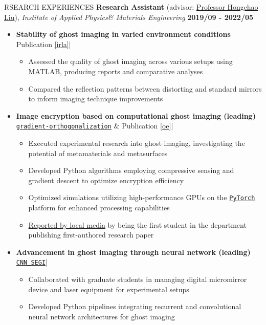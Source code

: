 \documentclass[10pt]{article} %
\begin{document}
\begin{section}{RSEARCH EXPERIENCES}
\textbf{Research Assistant} (advisor: \href{mailto:hcliu@um.edu.mo}{Professor Hongchao Liu}), \textit{Institute of Applied Physics\& Materials Engineering} \hfill \textbf{2019/09 - 2022/05} 
\begin{itemize}[leftmargin=1.5em]
    \item \textbf{Stability of ghost imaging in varied environment conditions} 
    \hfill {\footnotesize Publication \ref{irla}}| %
    \begin{itemize}[leftmargin=1.5em]
        \item Assessed the quality of ghost imaging across various setups using MATLAB, producing reports and comparative analyses
        \item Compared the reflection patterns between distorting and standard mirrors to inform imaging technique improvements
    \end{itemize}
    \item \textbf{Image encryption based on computational ghost imaging (leading)} 
    \hfill {\footnotesize \href{https://github.com/Chisen-Lupus/gradient-orthogonalization}{\texttt{gradient-orthogonalization}} \& Publication \ref{oe}}| %
    \begin{itemize}[leftmargin=1.5em]
        \item Executed experimental research into ghost imaging, investigating the potential of metamaterials and metasurfaces
        \item Developed Python algorithms employing compressive sensing and gradient descent to optimize encryption efficiency
        \item Optimized simulations utilizing high-performance GPUs on the \href{https://pytorch.org/}{\texttt{PyTorch}} platform for enhanced processing capabilities
        \item \href{https://www.tdm.com.mo/en/news-detail/683438?isvideo=false&lang=en&category=all}{Reported by local media} by being the first student in the department publishing first-authored research paper
    \end{itemize}
    \item \textbf{Advancement in ghost imaging through neural network (leading)} 
    \hfill {\footnotesize \href{https://github.com/Chisen-Lupus/CNN_SEGI}{\texttt{CNN\_SEGI}}}| %
    \begin{itemize}[leftmargin=1.5em]
        \item Collaborated with graduate students in managing digital micromirror device and laser equipment for experimental setups
        \item Developed Python pipelines integrating recurrent and convolutional neural network architectures for ghost imaging
    \end{itemize}
\end{itemize}


\end{section}
\end{document}
